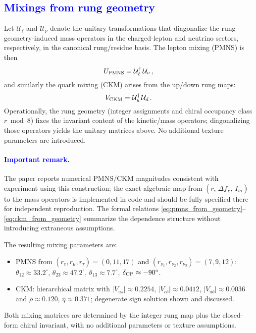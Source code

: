 \documentclass[%
amsmath,amssymb,
aps,
prb,
floatfix,showkeys
]{revtex4-2}
\newcommand{\modif}[1]{\textcolor{blue}{#1}}
\begin{document}
{\modif{\subsection{Mixings from rung geometry}
\label{subsec:mixing}}}

Let $\mathcal{U}_\ell$ and $\mathcal{U}_\nu$ denote the unitary transformations that diagonalize the rung-geometry-induced mass operators in the charged-lepton and neutrino sectors, respectively, in the canonical rung/residue basis. The lepton mixing (PMNS) is then
\begin{equation}
  U_{\rm PMNS} = \mathcal{U}_\ell^\dagger\,\mathcal{U}_\nu\,,
  \label{eq:pmns_from_geometry}
\end{equation}
and similarly the quark mixing (CKM) arises from the up/down rung maps:
\begin{equation}
  V_{\rm CKM} = \mathcal{U}_u^\dagger\,\mathcal{U}_d\,.
  \label{eq:ckm_from_geometry}
\end{equation}
Operationally, the rung geometry (integer assignments and chiral occupancy class $r\bmod 8$) fixes the invariant content of the kinetic/mass operators; diagonalizing those operators yields the unitary matrices above. No additional texture parameters are introduced.

\paragraph{\modif{Important remark.}}
The paper reports numerical PMNS/CKM magnitudes consistent with experiment using this construction; the exact algebraic map from $(r,\,\Delta f_\chi,\,I_m)$ to the mass operators is implemented in code and should be fully specified there for independent reproduction. The formal relations \eqref{eq:pmns_from_geometry}--\eqref{eq:ckm_from_geometry} summarize the dependence structure without introducing extraneous assumptions.

The resulting mixing parameters are:
\begin{itemize}
  \item PMNS from $(r_e,r_\mu,r_\tau)=(0,11,17)$ and $(r_{\nu_1},r_{\nu_2},r_{\nu_3})=(7,9,12)$: $\theta_{12}\approx33.2^\circ$, $\theta_{23}\approx47.2^\circ$, $\theta_{13}\approx7.7^\circ$, $\delta_{\rm CP}\approx-90^\circ$.
  \item CKM: hierarchical matrix with $|V_{us}|\approx0.2254$, $|V_{cb}|\approx0.0412$, $|V_{ub}|\approx0.0036$ and $\bar\rho\approx0.120$, $\bar\eta\approx0.371$; degenerate sign solution shown and discussed.
\end{itemize}
Both mixing matrices are determined by the integer rung map plus the closed-form chiral invariant, with no additional parameters or texture assumptions.
\end{document}
